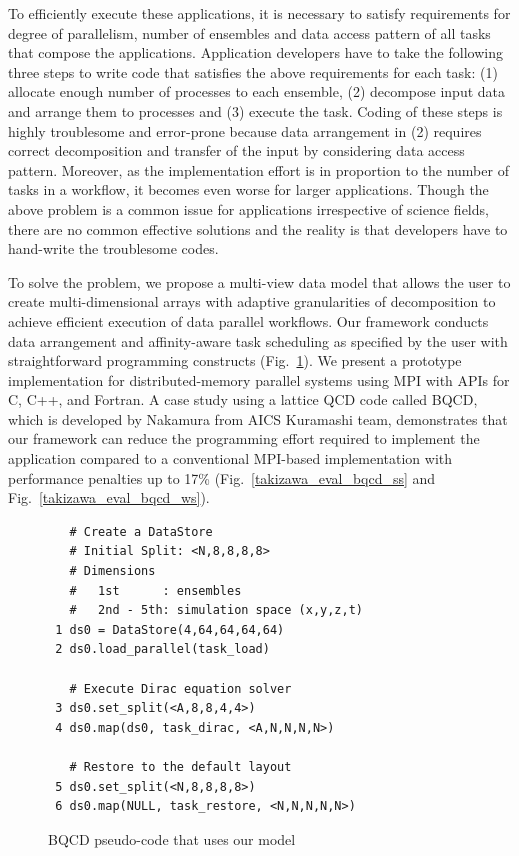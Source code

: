 \documentclass{book}
\begin{document}
To efficiently execute these applications, it is necessary to satisfy requirements for degree of parallelism, number of ensembles and data access pattern of all tasks that compose the applications.
Application developers have to take the following three steps to write code that satisfies the above requirements for each task: (1) allocate enough number of processes to each ensemble, (2) decompose input data and arrange them to processes and (3) execute the task.
Coding of these steps is highly troublesome and error-prone because data arrangement in (2) requires correct decomposition and transfer of the input by considering data access pattern.
Moreover, as the implementation effort is in proportion to the number of tasks in a workflow, it becomes even worse for larger applications.
Though the above problem is a common issue for applications irrespective of science fields, there are no common effective solutions and the reality is that developers have to hand-write the troublesome codes.

To solve the problem, we propose a multi-view data model that allows the user to create multi-dimensional arrays with adaptive granularities of decomposition to achieve efficient execution of data parallel workflows.
Our framework conducts data arrangement and affinity-aware task scheduling as specified by the user with straightforward programming constructs (Fig.~\ref{takizawa_sample}).
We present a prototype implementation for distributed-memory parallel systems using MPI with APIs for C, C++, and Fortran.
A case study using a lattice QCD code called BQCD, which is developed
by Nakamura from AICS Kuramashi team, demonstrates that our framework
can reduce the programming effort required to implement the
application compared to a conventional MPI-based implementation with
performance penalties up to 17\% (Fig.~\ref{takizawa_eval_bqcd_ss} and
Fig.~\ref{takizawa_eval_bqcd_ws}).

\begin{figure}[t]
\centering
\begin{verbatim}
   # Create a DataStore
   # Initial Split: <N,8,8,8,8>
   # Dimensions
   #   1st      : ensembles
   #   2nd - 5th: simulation space (x,y,z,t)
 1 ds0 = DataStore(4,64,64,64,64)
 2 ds0.load_parallel(task_load)

   # Execute Dirac equation solver
 3 ds0.set_split(<A,8,8,4,4>)
 4 ds0.map(ds0, task_dirac, <A,N,N,N,N>)

   # Restore to the default layout
 5 ds0.set_split(<N,8,8,8,8>)
 6 ds0.map(NULL, task_restore, <N,N,N,N,N>)
\end{verbatim}
\caption{BQCD pseudo-code that uses our model}
\label{takizawa_sample}
\end{figure}
\end{document}
